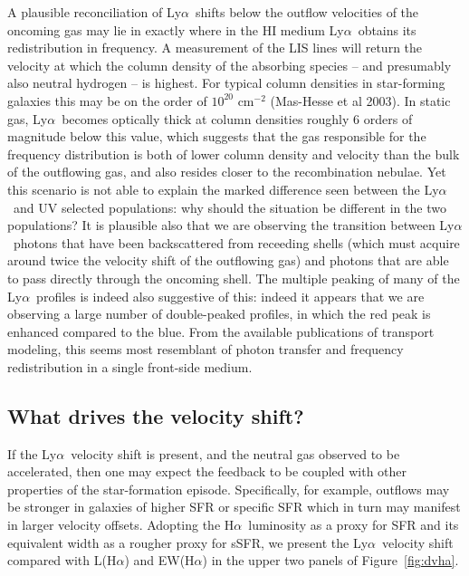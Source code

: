 \documentclass[manuscript]{emulateapj}
\newcommand{\lya}{Ly$\alpha$}
\newcommand{\ha}{H$\alpha$}
\begin{document}
A plausible reconciliation of \lya\ shifts below the outflow 
velocities of the oncoming gas may lie in exactly where in the HI medium
\lya\ obtains its redistribution in frequency.
A measurement of the LIS lines will return the velocity at which the column 
density of the absorbing species -- and presumably also neutral hydrogen -- 
is highest. For typical column densities in star-forming galaxies this may 
be on the order of $10^{20}$ cm$^{-2}$ (Mas-Hesse et al 2003). In static 
gas, \lya\ becomes optically
thick at column densities roughly 6 orders of magnitude below this value, which 
suggests that the gas responsible for the frequency distribution is both of lower
column density and velocity than the bulk of the outflowing gas, and also resides 
closer to the recombination nebulae. Yet this scenario is not able to explain
the marked difference seen between the \lya\ and UV selected populations: why
should the situation be different in the two populations? It is plausible also 
that we are observing the transition between \lya\ photons that have been 
backscattered from receeding shells (which must acquire around twice the
velocity shift of the outflowing gas) and photons that are able to pass directly
through the oncoming shell. The multiple peaking of many of the \lya\ profiles 
is indeed also suggestive of this: indeed it appears that we are observing 
a large number of double-peaked profiles, in which the red peak is enhanced 
compared to the blue. From the available publications of transport modeling, 
this seems most resemblant of photon transfer and frequency redistribution
in a single front-side medium. 

\subsection{What drives the velocity shift?} 

If the \lya\ velocity shift is present, and the neutral gas observed to 
be accelerated, then one may expect the feedback to be coupled with other
properties of the star-formation episode. 
 Specifically, for example, outflows may be stronger in 
galaxies of higher SFR or specific SFR which in turn may manifest in 
larger velocity offsets. Adopting the \ha\ luminosity as a proxy for SFR
and its equivalent width as a rougher proxy for sSFR, we present the \lya\ 
velocity shift compared with L(\ha) and EW(\ha) in the upper two panels
of Figure~\ref{fig:dvha}. 
\end{document}
